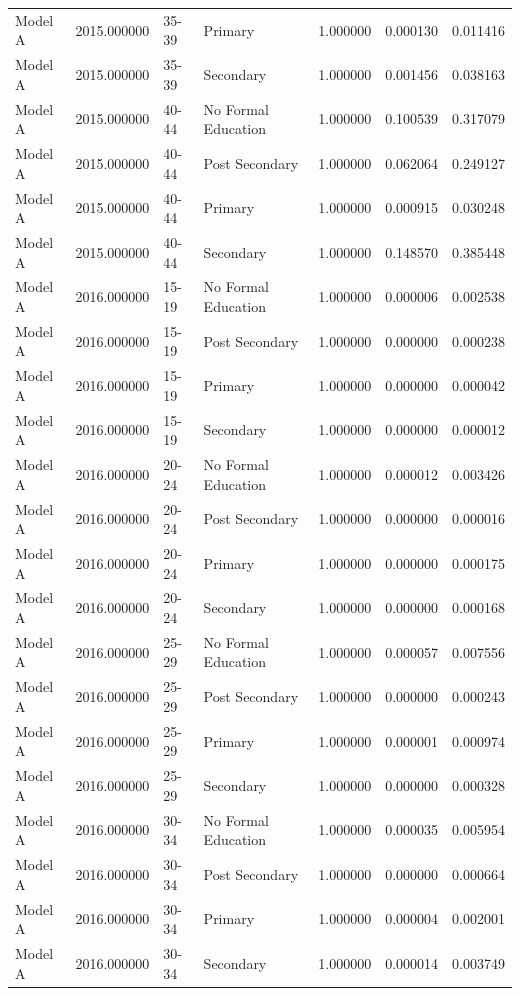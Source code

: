 \begin{table}[ht]
\begin{tabular}{lrllrrr}
Model A & 2015.000000 & 35-39 & Primary & 1.000000 & 0.000130 & 0.011416 \\
Model A & 2015.000000 & 35-39 & Secondary & 1.000000 & 0.001456 & 0.038163 \\
Model A & 2015.000000 & 40-44 & No Formal Education & 1.000000 & 0.100539 & 0.317079 \\
Model A & 2015.000000 & 40-44 & Post Secondary & 1.000000 & 0.062064 & 0.249127 \\
Model A & 2015.000000 & 40-44 & Primary & 1.000000 & 0.000915 & 0.030248 \\
Model A & 2015.000000 & 40-44 & Secondary & 1.000000 & 0.148570 & 0.385448 \\
Model A & 2016.000000 & 15-19 & No Formal Education & 1.000000 & 0.000006 & 0.002538 \\
Model A & 2016.000000 & 15-19 & Post Secondary & 1.000000 & 0.000000 & 0.000238 \\
Model A & 2016.000000 & 15-19 & Primary & 1.000000 & 0.000000 & 0.000042 \\
Model A & 2016.000000 & 15-19 & Secondary & 1.000000 & 0.000000 & 0.000012 \\
Model A & 2016.000000 & 20-24 & No Formal Education & 1.000000 & 0.000012 & 0.003426 \\
Model A & 2016.000000 & 20-24 & Post Secondary & 1.000000 & 0.000000 & 0.000016 \\
Model A & 2016.000000 & 20-24 & Primary & 1.000000 & 0.000000 & 0.000175 \\
Model A & 2016.000000 & 20-24 & Secondary & 1.000000 & 0.000000 & 0.000168 \\
Model A & 2016.000000 & 25-29 & No Formal Education & 1.000000 & 0.000057 & 0.007556 \\
Model A & 2016.000000 & 25-29 & Post Secondary & 1.000000 & 0.000000 & 0.000243 \\
Model A & 2016.000000 & 25-29 & Primary & 1.000000 & 0.000001 & 0.000974 \\
Model A & 2016.000000 & 25-29 & Secondary & 1.000000 & 0.000000 & 0.000328 \\
Model A & 2016.000000 & 30-34 & No Formal Education & 1.000000 & 0.000035 & 0.005954 \\
Model A & 2016.000000 & 30-34 & Post Secondary & 1.000000 & 0.000000 & 0.000664 \\
Model A & 2016.000000 & 30-34 & Primary & 1.000000 & 0.000004 & 0.002001 \\
Model A & 2016.000000 & 30-34 & Secondary & 1.000000 & 0.000014 & 0.003749 \\

\end{tabular}
\end{table}
